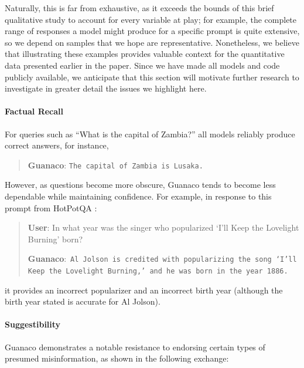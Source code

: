 Naturally, this is far from exhaustive, as it exceeds the bounds of this brief qualitative study to account for every variable at play; for example, the complete range of responses a model might produce for a specific prompt is quite extensive, so we depend on samples that we hope are representative. Nonetheless, we believe that illustrating these examples provides valuable context for the quantitative data presented earlier in the paper. Since we have made all models and code publicly available, we anticipate that this section will motivate further research to investigate in greater detail the issues we highlight here.  
\paragraph{Factual Recall} For queries such as ``What is the capital of Zambia?'' all models reliably produce correct answers, for instance,  

\begin{quote} 
    \textbf{Guanaco}:
    \texttt{The capital of Zambia is Lusaka.}
\end{quote}

However, as questions become more obscure, {Guanaco} tends to become less dependable while maintaining confidence. For example, in response to this prompt from HotPotQA \citep{yang2018hotpotqa}:  

\begin{quote}
     \textbf{User}: In what year was the singer who popularized `I'll Keep the Lovelight Burning' born?  

     \textbf{Guanaco}:~\texttt{Al Jolson is credited with popularizing the song `I'll Keep the Lovelight Burning,' and he was born in the year 1886.}
 \end{quote}

it provides an incorrect popularizer and an incorrect birth year (although the birth year stated is accurate for Al Jolson).  

\paragraph{Suggestibility} {Guanaco} demonstrates a notable resistance to endorsing certain types of presumed misinformation, as shown in the following exchange:

